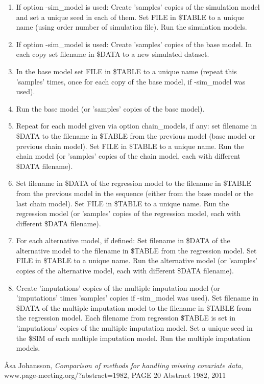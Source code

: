 \begin{enumerate}

\item If option -sim\_model is used: Create 'samples' copies of the simulation model and set a unique  seed in each of them. Set FILE in \$TABLE to a unique name (using order number of simulation file). Run the simulation models.
\item If option -sim\_model is used: Create 'samples' copies of the base model. In each copy set filename in \$DATA to a new simulated dataset.
\item In the base model set FILE in \$TABLE to a unique name (repeat this 'samples' times, once for each copy of the base model, if -sim\_model was used).
\item Run the base model (or 'samples' copies of the base model).
\item Repeat for each model given via option chain\_models, if any: set filename in \$DATA to the filename in \$TABLE from the previous model (base model or previous chain model). Set FILE in \$TABLE to a unique name. Run the chain model (or 'samples' copies of the chain model, each with different \$DATA filename).
\item Set filename in \$DATA of the regression model to the filename in \$TABLE from the previous model in the sequence (either from the base model or the last chain model). Set FILE in \$TABLE to a unique name. Run the regression model (or 'samples' copies of the regression model, each with different \$DATA filename).
\item For each alternative model, if defined: Set filename in \$DATA of the alternative model to the filename in \$TABLE from the regression model. Set FILE in \$TABLE to a unique name. Run the alternative model (or 'samples' copies of the alternative model, each with different \$DATA filename).
\item Create 'imputations' copies of the multiple imputation model (or 'imputations' times 'samples' copies if -sim\_model was used). Set filename in \$DATA of the multiple imputation model to the filename in \$TABLE from the regression model. Each filename from regression \$TABLE is set in 'imputations' copies of the multiple imputation model. Set a unique seed in the \$SIM of each multiple imputation model. Run the multiple imputation models.
\end{enumerate}



\begin{thebibliography}{1}

 Åsa Johansson, {\em Comparison of methods for handling missing covariate data}, www.page-meeting.org/?abstract=1982, PAGE 20 Abstract 1982, 2011
\end{thebibliography}



